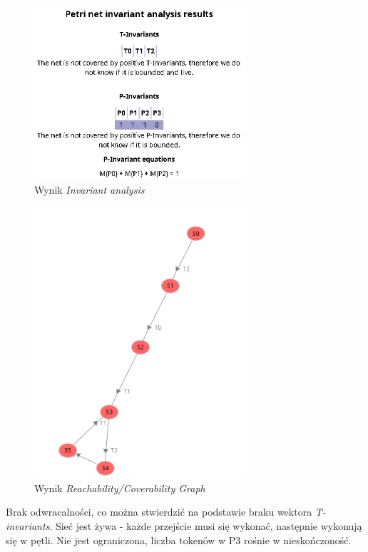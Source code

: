 \documentclass{article}
\begin{document}
\begin{figure}[H]
    \centering
    \includegraphics[width=0.7\textwidth]{invariant_2.png}
    \caption{Wynik \textit{Invariant analysis}}
\end{figure}

\begin{figure}[H]
    \centering
    \includegraphics[width=0.7\textwidth]{graph_2.png}
    \caption{Wynik \textit{Reachability/Coverability Graph}}
\end{figure}

Brak odwracalności, co można stwierdzić na podstawie braku wektora \textit{T-invariants}.
Sieć jest żywa - każde przejście musi się wykonać, następnie wykonują się w pętli.
Nie jest ograniczona, liczba tokenów w P3 rośnie w nieskończoność.
\end{document}
